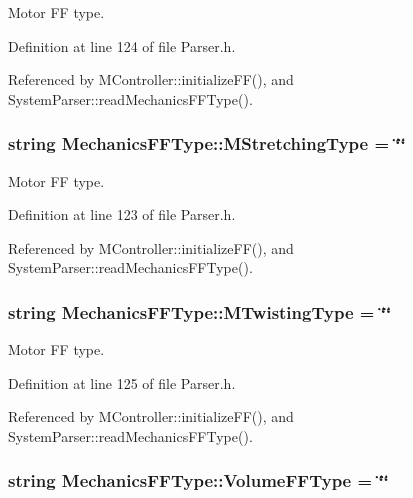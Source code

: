 Motor F\+F type. 



Definition at line 124 of file Parser.\+h.



Referenced by M\+Controller\+::initialize\+F\+F(), and System\+Parser\+::read\+Mechanics\+F\+F\+Type().

\hypertarget{structMechanicsFFType_a30fba4413229de2a9ab88af789e47292}{
\subsubsection[{M\+Stretching\+Type}]{\setlength{\rightskip}{0pt plus 5cm}string Mechanics\+F\+F\+Type\+::\+M\+Stretching\+Type = \char`\"{}\char`\"{}}}\label{structMechanicsFFType_a30fba4413229de2a9ab88af789e47292}


Motor F\+F type. 



Definition at line 123 of file Parser.\+h.



Referenced by M\+Controller\+::initialize\+F\+F(), and System\+Parser\+::read\+Mechanics\+F\+F\+Type().

\hypertarget{structMechanicsFFType_a76f25f6b34dc38d73dfecb236500c53b}{
\subsubsection[{M\+Twisting\+Type}]{\setlength{\rightskip}{0pt plus 5cm}string Mechanics\+F\+F\+Type\+::\+M\+Twisting\+Type = \char`\"{}\char`\"{}}}\label{structMechanicsFFType_a76f25f6b34dc38d73dfecb236500c53b}


Motor F\+F type. 



Definition at line 125 of file Parser.\+h.



Referenced by M\+Controller\+::initialize\+F\+F(), and System\+Parser\+::read\+Mechanics\+F\+F\+Type().

\hypertarget{structMechanicsFFType_a5f694c3765d3856e1987c22d167490a7}{
\subsubsection[{Volume\+F\+F\+Type}]{\setlength{\rightskip}{0pt plus 5cm}string Mechanics\+F\+F\+Type\+::\+Volume\+F\+F\+Type = \char`\"{}\char`\"{}}}\label{structMechanicsFFType_a5f694c3765d3856e1987c22d167490a7}


